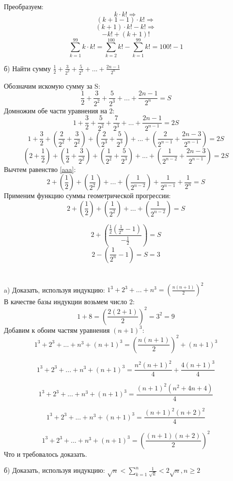 \documentclass[a4paper]{article}
\begin{document}
Преобразуем:
\[k\cdot k!\Rightarrow\]
\[(k + 1 -1)\cdot k!\Rightarrow\]
\[(k + 1)\cdot k! - k!\Rightarrow\]
\[ - k!  + (k + 1)! \]
\[\sum^{99}_{k=1}k\cdot k! = \sum^{100}_{k=2}k! - \sum^{99}_{k=1}k! = 100! -1\]


б) Найти сумму $\frac{1}{2} + \frac{3}{2^2} + \frac{5}{2^3} + ... + \frac{2n -1}{2^n}$

Обозначим искомую сумму за S:
\begin{equation}\label{aaa}
\frac{1}{2} + \frac{3}{2^2} + \frac{5}{2^3} + ... + \frac{2n -1}{2^n} = S
\end{equation}
Домножим обе части уравнения на 2:
\[1 + \frac{3}{2} + \frac{5}{2^2} +\frac{7}{2^3}+ ... + \frac{2n -1}{2^{n-1}} = 2S \]
\[1 + \frac{3}{2} + (\frac{2}{2^2} + \frac{3}{2^2}) +(\frac{2}{2^3} + \frac{5}{2^3})+ ... +(\frac{2}{2^{n-1}} + \frac{2n - 3}{2^{n-1}}) = 2S \]
\[(2 +\frac{1}{2}) + (\frac{1}{2} + \frac{3}{2^2}) +(\frac{1}{2^2} + \frac{5}{2^3})+ ... +(\frac{1}{2^{n-2}} + \frac{2n - 3}{2^{n-1}}) = 2S \]
Вычтем равенство \eqref{aaa}:
\[2 + (\frac{1}{2}) +(\frac{1}{2^2})+ ... +(\frac{1}{2^{n-2}})+ \frac{1}{2^{n-1}} + \frac{1}{2^n} = S \]
Применим функцию суммы геометрической прогрессии:
\[2 + (\frac{1}{2}) +(\frac{1}{2^2})+ ... +(\frac{1}{2^{n-2}}) = S \]

\[2 + (\frac{\frac{1}{2}(\frac{1}{2^n} - 1)}{-\frac{1}{2}})= S \]
\[2 - (\frac{1}{2^n} - 1)= S = 3 \]
\newpage

\section{}
a) Доказать, используя индукцию: $1^3 + 2^3 + ... + n^3 = (\frac{n(n + 1)}{2})^2$\\
В качестве базы индукции возьмем число 2:
\[1 + 8 = (\frac{2(2 + 1)}{2})^2 = 3^2 = 9\]
Добавим к обоим частям уравнения $(n + 1)^3$:
\[1^3 + 2^3 + ... + n^3 + (n + 1)^3 = (\frac{n(n + 1)}{2})^2 + (n + 1)^3\]

\[1^3 + 2^3 + ... + n^3 + (n + 1)^3 = \frac{n^2(n + 1)^2}{4} + \frac{4(n + 1)^3}{4}\]

\[1^3 + 2^3 + ... + n^3 + (n + 1)^3 = \frac{(n + 1)^2(n^2 + 4n + 4)}{4}\]

\[1^3 + 2^3 + ... + n^3 + (n + 1)^3 = \frac{(n + 1)^2(n+ 2)^2}{4}\]

\[1^3 + 2^3 + ... + n^3 + (n + 1)^3 = (\frac{(n + 1)(n+ 2)}{2})^2\]
Что и требовалось доказать.

б) Доказать, используя индукцию: $ \sqrt{n} < \sum_{k=1}^n\frac{1}{\sqrt{k}} < 2 \sqrt{n}, n \geqslant 2 $
\end{document}
